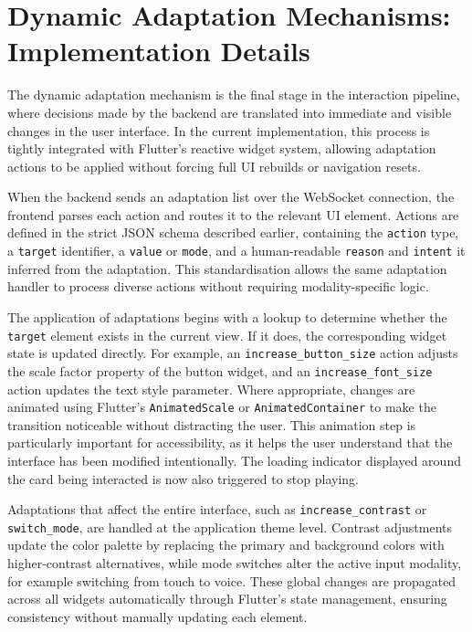\documentclass[openany]{book}
\begin{document}
\section{Dynamic Adaptation Mechanisms: Implementation Details}
The dynamic adaptation mechanism is the final stage in the interaction pipeline, where decisions made by the backend are translated into immediate and visible changes in the user interface. In the current implementation, this process is tightly integrated with Flutter’s reactive widget system, allowing adaptation actions to be applied without forcing full UI rebuilds or navigation resets.

When the backend sends an adaptation list over the WebSocket connection, the frontend parses each action and routes it to the relevant UI element. Actions are defined in the strict JSON schema described earlier, containing the \texttt{action} type, a \texttt{target} identifier, a \texttt{value} or \texttt{mode}, and a human-readable \texttt{reason} and \texttt{intent} it inferred from the adaptation. This standardisation allows the same adaptation handler to process diverse actions without requiring modality-specific logic.

The application of adaptations begins with a lookup to determine whether the \texttt{target} element exists in the current view. If it does, the corresponding widget state is updated directly. For example, an \texttt{increase\_button\_size} action adjusts the scale factor property of the button widget, and an \texttt{increase\_font\_size} action updates the text style parameter. Where appropriate, changes are animated using Flutter’s \texttt{AnimatedScale} or \texttt{AnimatedContainer} to make the transition noticeable without distracting the user. This animation step is particularly important for accessibility, as it helps the user understand that the interface has been modified intentionally. The loading indicator displayed around the card being interacted is now also triggered to stop playing.

Adaptations that affect the entire interface, such as \texttt{increase\_contrast} or \texttt{switch\_mode}, are handled at the application theme level. Contrast adjustments update the color palette by replacing the primary and background colors with higher-contrast alternatives, while mode switches alter the active input modality, for example switching from touch to voice. These global changes are propagated across all widgets automatically through Flutter’s state management, ensuring consistency without manually updating each element.
\end{document}
